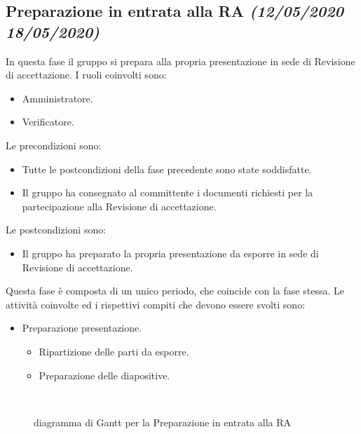 \documentclass[../piano-di-progetto.tex]{subfiles}
\begin{document}
\subsection[Preparazione in entrata alla RA]{Preparazione in entrata alla RA {\normalsize\normalfont\itshape(12/05/2020  18/05/2020)}}%
\label{sub:preparazione_in_entrata_alla_ra}
In questa fase il gruppo si prepara alla propria presentazione in sede di Revisione di accettazione.
I ruoli coinvolti sono:
\begin{itemize}
  \item Amministratore.
  \item Verificatore.
\end{itemize}
Le precondizioni sono:
\begin{itemize}
  \item Tutte le postcondizioni della fase precedente sono state soddisfatte.
  \item Il gruppo ha consegnato al committente i documenti richiesti per la partecipazione alla Revisione di accettazione.
\end{itemize}
Le postcondizioni sono:
\begin{itemize}
  \item Il gruppo ha preparato la propria presentazione da esporre in sede di Revisione di accettazione.
\end{itemize}
Questa fase è composta di un unico periodo, che coincide con la fase stessa.
Le attività coinvolte ed i rispettivi compiti che devono essere svolti sono:
\begin{itemize}
  \item Preparazione presentazione.
  \begin{itemize}
    \item Ripartizione delle parti da esporre.
    \item Preparazione delle diapositive.
  \end{itemize}
\end{itemize}
\begin{figure}[H]
  \centering
  
  \caption{diagramma di Gantt per la Preparazione in entrata alla RA}%
~~\label{fig:gantt_preparazione_ra}
\end{figure}
\end{document}

